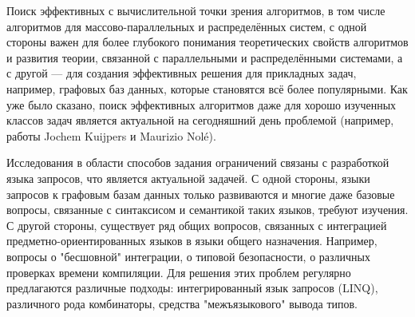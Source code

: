 \documentclass[12pt]{article}  %
\theoremstyle{remark}
\begin{document}
Поиск эффективных с вычислительной точки зрения алгоритмов, в том числе алгоритмов для массово-параллельных и распределённых систем, с одной стороны важен для более глубокого понимания теоретических свойств алгоритмов и развития теории, связанной с параллельными и распределёнными системами, а с другой — для создания эффективных решения для прикладных задач, например, графовых баз данных, которые становятся всё более популярными. Как уже было сказано, поиск эффективных алгоритмов даже для хорошо изученных классов задач является актуальной на сегодняшний день проблемой (например, работы Jochem Kuijpers и Maurizio Nolé).

Исследования в области способов задания ограничений связаны с разработкой языка запросов, что является актуальной задачей. С одной стороны, языки запросов к графовым базам данных только развиваются и многие даже базовые вопросы, связанные с синтаксисом и семантикой таких языков, требуют изучения. С другой стороны, существует ряд общих вопросов, связанных с интеграцией предметно-ориентированных языков в языки общего назначения. Например, вопросы о "бесшовной" интеграции, о типовой безопасности, о различных проверках времени компиляции. Для решения этих проблем регулярно предлагаются различные подходы: интегрированный язык запросов (LINQ), различного рода комбинаторы, средства "межъязыкового" вывода типов.
\end{document}

